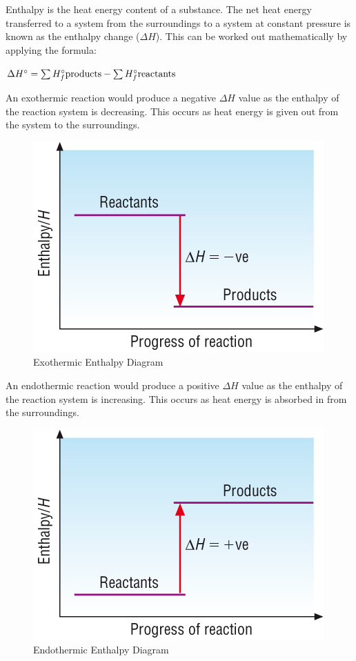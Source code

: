 Enthalpy is the heat energy content of a substance. The net heat energy transferred to a system from the surroundings to a system at constant pressure is known as the enthalpy change ($\Delta H$). This can be worked out mathematically by applying the formula:

$\Delta H^\circ = \sum {H^\circ _f {\rm{products}}} - \sum {H^\circ _f {\rm{reactants}}}$

An exothermic reaction would produce a negative $\Delta H$ value as the enthalpy of the reaction system is decreasing. This occurs as heat energy is given out from the system to the surroundings. 

\begin{figure}[H]
    \includegraphics[width=\textwidth]{./Planning/Images/Exothermic.jpg}
    \caption{Exothermic Enthalpy Diagram} \label{fig:Exothermic}
\end{figure}

An endothermic reaction would produce a positive $\Delta H$ value as the enthalpy of the reaction system is increasing. This occurs as heat energy is absorbed in from the surroundings.

\begin{figure}[H]
    \includegraphics[width=\textwidth]{./Planning/Images/Endothermic.jpg}
    \caption{Endothermic Enthalpy Diagram} \label{fig:Endothermic}
\end{figure}


